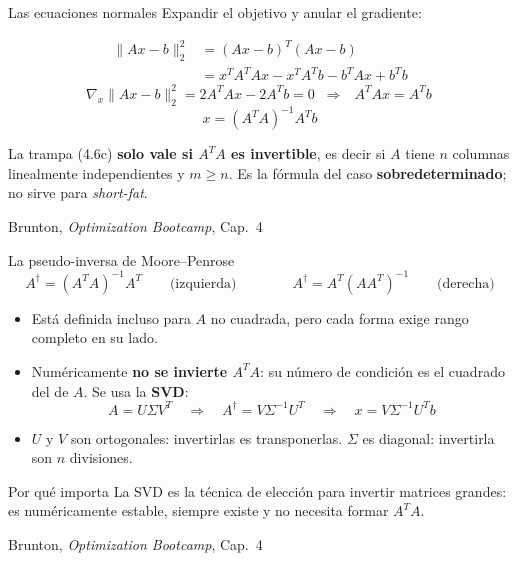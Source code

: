 \documentclass[10pt,aspectratio=169]{beamer}
\newcommand{\fuente}{\vfill{\scriptsize\color{gray}Brunton, \emph{Optimization Bootcamp}, Cap.~4}}
\begin{document}
\begin{frame}{Las ecuaciones normales}
  \small
  Expandir el objetivo y anular el gradiente:

  \begin{align*}
    \|Ax-b\|_2^2 &= (Ax-b)^T(Ax-b) \\
                 &= x^TA^TAx - x^TA^Tb - b^TAx + b^Tb \tag{4.5c}
  \end{align*}
  \[
    \nabla_x \|Ax-b\|_2^2 = 2A^TAx - 2A^Tb = 0
    \;\;\Longrightarrow\;\;
    \boxed{\,A^TAx = A^Tb\,} \tag{4.6b}
  \]
  \[
    x = (A^TA)^{-1}A^Tb \tag{4.6c}
  \]

  \begin{alertblock}{La trampa}
    (4.6c) \textbf{solo vale si $A^TA$ es invertible}, es decir si $A$ tiene
    $n$ columnas linealmente independientes y $m \ge n$. Es la fórmula del caso
    \textbf{sobredeterminado}; no sirve para \emph{short-fat}.
  \end{alertblock}
  \fuente
\end{frame}

\begin{frame}{La pseudo-inversa de Moore--Penrose}
  \small
  \[
    A^{\dagger} = (A^TA)^{-1}A^T
    \qquad\text{(izquierda)}
    \qquad\qquad
    A^{\dagger} = A^T(AA^T)^{-1}
    \qquad\text{(derecha)}
  \]

  \begin{itemize}
    \item Está definida incluso para $A$ no cuadrada, pero cada forma exige
      rango completo en su lado.
    \item Numéricamente \textbf{no se invierte $A^TA$}: su número de condición
      es el cuadrado del de $A$. Se usa la \textbf{SVD}:
      \[
        A = U\Sigma V^T
        \quad\Longrightarrow\quad
        A^{\dagger} = V\Sigma^{-1}U^T
        \quad\Longrightarrow\quad
        x = V\Sigma^{-1}U^T b \tag{4.7}
      \]
    \item $U$ y $V$ son ortogonales: invertirlas es transponerlas.
      $\Sigma$ es diagonal: invertirla son $n$ divisiones.
  \end{itemize}

  \begin{block}{Por qué importa}
    \scriptsize
    La SVD es la técnica de elección para invertir matrices grandes: es
    numéricamente estable, siempre existe y no necesita formar $A^TA$.
  \end{block}
  \fuente
\end{frame}
\end{document}
